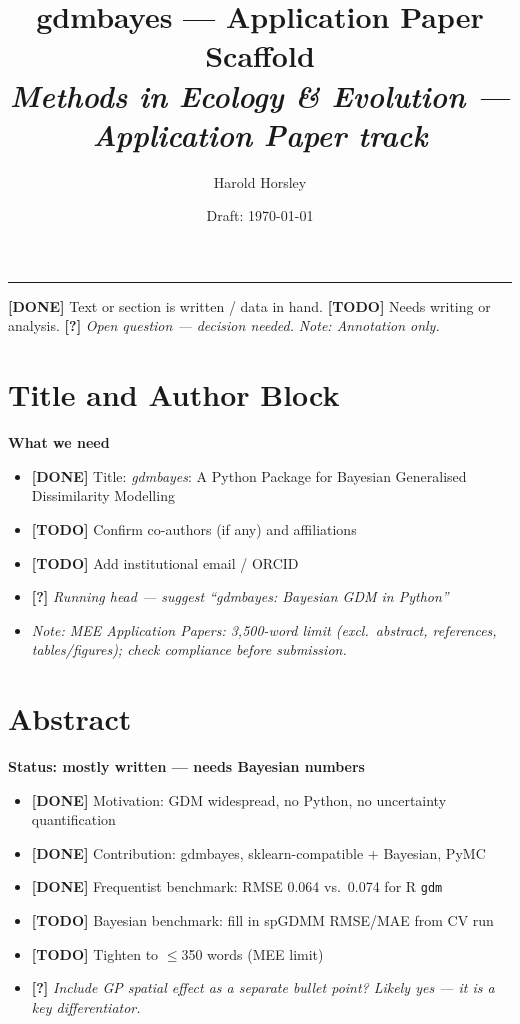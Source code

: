 \documentclass[11pt,a4paper]{article}
\title{\textbf{gdmbayes} --- Application Paper Scaffold\\[0.4em]
       \normalsize\textit{Methods in Ecology \& Evolution --- Application Paper track}}
\author{Harold Horsley}
\date{Draft: \today}
\newcommand{\done}[1]{{\color{donegreen}\textbf{[DONE]} #1}}
\newcommand{\todo}[1]{{\color{todored}\textbf{[TODO]} #1}}
\newcommand{\question}[1]{{\color{questionblue}\textbf{[?]} \textit{#1}}}
\newcommand{\note}[1]{{\color{notegray}\textit{Note: #1}}}
\newenvironment{scaffold}[1]{%
  \begin{mdframed}[backgroundcolor=gray!6, linecolor=gray!30,
                   leftmargin=0pt, rightmargin=0pt,
                   innerleftmargin=8pt, innerrightmargin=8pt,
                   innertopmargin=6pt, innerbottommargin=6pt]
  \noindent\textbf{#1}\par\vspace{2pt}
  \begin{itemize}[leftmargin=1.4em, topsep=2pt, itemsep=1pt, parsep=0pt]
}{%
  \end{itemize}
  \end{mdframed}
  \vspace{4pt}
}
\begin{document}
\maketitle
\onehalfspacing
\tableofcontents
\vspace{1em}
\noindent\rule{\linewidth}{0.4pt}

\noindent
\done{Text or section is written / data in hand.}\quad
\todo{Needs writing or analysis.}\quad
\question{Open question --- decision needed.}\quad
\note{Annotation only.}

\vspace{1em}

\section{Title and Author Block}

\begin{scaffold}{What we need}
  \item \done{Title: \textit{gdmbayes}: A Python Package for Bayesian Generalised
    Dissimilarity Modelling}
  \item \todo{Confirm co-authors (if any) and affiliations}
  \item \todo{Add institutional email / ORCID}
  \item \question{Running head --- suggest ``gdmbayes: Bayesian GDM in Python''}
  \item \note{MEE Application Papers: 3,500-word limit (excl.\ abstract,
    references, tables/figures); check compliance before submission.}
\end{scaffold}


\section{Abstract}

\begin{scaffold}{Status: mostly written --- needs Bayesian numbers}
  \item \done{Motivation: GDM widespread, no Python, no uncertainty quantification}
  \item \done{Contribution: gdmbayes, sklearn-compatible + Bayesian, PyMC}
  \item \done{Frequentist benchmark: RMSE 0.064 vs.\ 0.074 for R \texttt{gdm}}
  \item \todo{Bayesian benchmark: fill in spGDMM RMSE/MAE from CV run}
  \item \todo{Tighten to $\leq$350 words (MEE limit)}
  \item \question{Include GP spatial effect as a separate bullet point?
    Likely yes --- it is a key differentiator.}
\end{scaffold}
\end{document}
